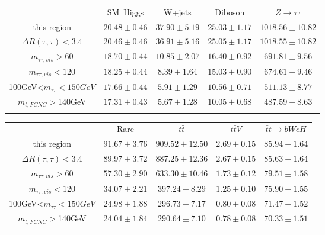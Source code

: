 \centering
\begin{tabular}{ccccc} \toprule\toprule
 & SM~Higgs & W+jets & Diboson & $Z\to \tau\tau$\\
 this region & $20.48\pm0.46$ & $37.90\pm5.19$ & $25.03\pm1.17$ & $1018.56\pm10.82$\\
$\Delta R(\tau,\tau)<3.4$ & $20.46\pm0.46$ & $36.91\pm5.16$ & $25.05\pm1.17$ & $1018.55\pm10.82$\\
$m_{\tau\tau,vis}>60$ & $18.70\pm0.44$ & $10.85\pm2.07$ & $16.40\pm0.92$ & $691.81\pm9.56$\\
$m_{\tau\tau,vis}<120$ & $18.25\pm0.44$ & $8.39\pm1.64$ & $15.03\pm0.90$ & $674.61\pm9.46$\\
100GeV<$m_{\tau\tau}<150GeV$ & $17.66\pm0.44$ & $5.91\pm1.29$ & $10.56\pm0.71$ & $511.13\pm8.77$\\
$m_{t,FCNC}>$140GeV & $17.31\pm0.43$ & $5.67\pm1.28$ & $10.05\pm0.68$ & $487.59\pm8.63$\\
\bottomrule\bottomrule\\
\end{tabular}
\begin{tabular}{ccccc} \toprule\toprule
 & Rare & $t\bar{t}$ & $t\bar{t}V$ & $\bar{t}t\to bWcH$\\
this region & $91.67\pm3.76$ & $909.52\pm12.50$ & $2.69\pm0.15$ & $85.94\pm1.64$\\
$\Delta R(\tau,\tau)<3.4$ & $89.97\pm3.72$ & $887.25\pm12.36$ & $2.67\pm0.15$ & $85.63\pm1.64$\\
$m_{\tau\tau,vis}>60$ & $57.30\pm2.90$ & $633.30\pm10.46$ & $1.73\pm0.12$ & $79.51\pm1.58$\\
$m_{\tau\tau,vis}<120$ & $34.07\pm2.21$ & $397.24\pm8.29$ & $1.25\pm0.10$ & $75.90\pm1.55$\\
100GeV<$m_{\tau\tau}<150GeV$ & $24.98\pm1.88$ & $296.73\pm7.17$ & $0.80\pm0.08$ & $71.47\pm1.52$\\
$m_{t,FCNC}>$140GeV & $24.04\pm1.84$ & $290.64\pm7.10$ & $0.78\pm0.08$ & $70.33\pm1.51$\\
\bottomrule\bottomrule\\
\end{tabular}
